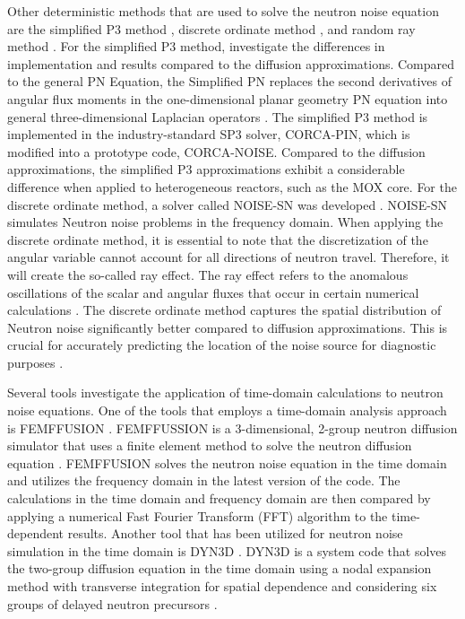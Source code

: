 Other deterministic methods that are used to solve the neutron noise equation are the simplified P3 method \cite{brantleySimplifiedApproximation2000, gongNeutronNoiseCalculation2021}, discrete ordinate method \cite{bahramiSNTransportMethod2018, yiSimulationNeutronNoise2021}, and random ray method \cite{cosgroveMemoryefficientNeutronNoise2024}. For the simplified P3 method, \cite{gongNeutronNoiseCalculation2021} investigate the differences in implementation and results compared to the diffusion approximations. Compared to the general PN Equation, the Simplified PN replaces the second derivatives of angular flux moments in the one-dimensional planar geometry PN equation into general three-dimensional Laplacian operators \cite{brantleySimplifiedApproximation2000}. The simplified P3 method is implemented in the industry-standard SP3 solver, CORCA-PIN, which is modified into a prototype code, CORCA-NOISE. Compared to the diffusion approximations, the simplified P3 approximations exhibit a considerable difference when applied to heterogeneous reactors, such as the MOX core. For the discrete ordinate method, a solver called NOISE-SN was developed \cite{yiSimulationNeutronNoise2021}. NOISE-SN simulates Neutron noise problems in the frequency domain. When applying the discrete ordinate method, it is essential to note that the discretization of the angular variable cannot account for all directions of neutron travel. Therefore, it will create the so-called ray effect. The ray effect refers to the anomalous oscillations of the scalar and angular fluxes that occur in certain numerical calculations \cite{lathropRayEffectsDiscrete1968}.  The discrete ordinate method captures the spatial distribution of Neutron noise significantly better compared to diffusion approximations. This is crucial for accurately predicting the location of the noise source for diagnostic purposes \cite{bahramiPreciseLocalizationNeutron2021}. 

Several tools investigate the application of time-domain calculations to neutron noise equations. One of the tools that employs a time-domain analysis approach is FEMFFUSION \cite{vidal-ferrandizNeutronicSimulationFuel2020, vidal-ferrandizTimeFrequencyDomain2020, vidal-ferrandizModellingSimulationsReactor2022, vidal-ferrandizFEMFFUSIONFiniteElement2023}. FEMFFUSSION is a 3-dimensional, 2-group neutron diffusion simulator that uses a finite element method to solve the neutron diffusion equation \cite{vidal-ferrandizMovingMeshesSolve2016, vidal-ferrandizSolutionLambdaModes2014}. FEMFFUSION solves the neutron noise equation in the time domain and utilizes the frequency domain in the latest version of the code. The calculations in the time domain and frequency domain are then compared by applying a numerical Fast Fourier Transform (FFT) algorithm to the time-dependent results. Another tool that has been utilized for neutron noise simulation in the time domain is DYN3D \cite{viebachInfluenceDynamicalFuel2018, viebachVerificationCodeDYN3D2022}. DYN3D is a system code that solves the two-group diffusion equation in the time domain using a nodal expansion method with transverse integration for spatial dependence and considering six groups of delayed neutron precursors \cite{viebachVerificationCodeDYN3D2022}. 


